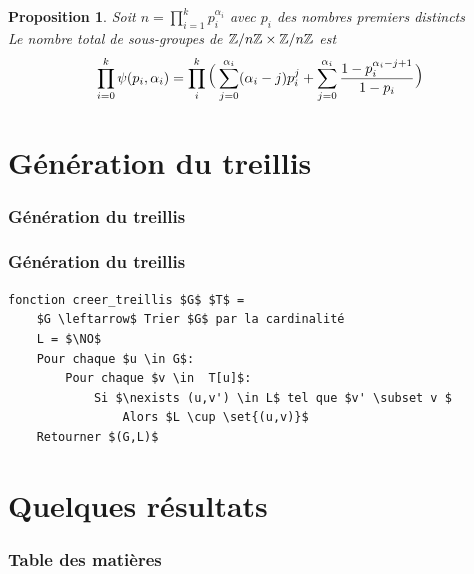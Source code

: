\documentclass[10pt]{beamer}
\newtheorem{prp}{Proposition}
\begin{document}
\begin{frame}
    \begin{prp}
        Soit $n = \prod\limits_{i = 1}^k p_i^{\alpha_i}$ avec $p_i$ des nombres premiers distincts\\
		Le nombre total de sous-groupes de $\mathbb Z/n\mathbb Z \times \mathbb Z/n\mathbb Z$ est
		$$\prod_{i = 0}^{k} \psi(p_i,\alpha_i)
			= \prod_i^k\mlarge[3](\sum_{j=0}^{\alpha_i}(\alpha_i-j)p_i^j +%
			\sum_{j = 0}^{\alpha_i}\frac{1- p_i^{\alpha_i-j+1}}{1 - p_i}\mlarge[3])$$
    \end{prp}
\end{frame}


\section{Génération du treillis}
\begin{frame}
    \frametitle{Génération du treillis}
    \tableofcontents[currentsection]
\end{frame}

\begin{frame}[fragile]
    \frametitle{Génération du treillis}
    \begin{lstlisting}
fonction creer_treillis $G$ $T$ =
	$G \leftarrow$ Trier $G$ par la cardinalité
	L = $\NO$
	Pour chaque $u \in G$:
		Pour chaque $v \in  T[u]$:
			Si $\nexists (u,v') \in L$ tel que $v' \subset v $
				Alors $L \cup \set{(u,v)}$
	Retourner $(G,L)$
\end{lstlisting}
\end{frame}


\section{Quelques résultats}
\begin{frame}
    \frametitle{Table des matières}
    \tableofcontents[currentsection]
\end{frame}
\end{document}
